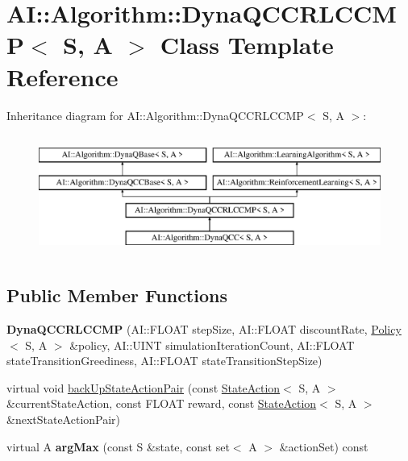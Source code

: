 \hypertarget{classAI_1_1Algorithm_1_1DynaQCCRLCCMP}{\section{A\-I\-:\-:Algorithm\-:\-:Dyna\-Q\-C\-C\-R\-L\-C\-C\-M\-P$<$ S, A $>$ Class Template Reference}
\label{classAI_1_1Algorithm_1_1DynaQCCRLCCMP}
}
Inheritance diagram for A\-I\-:\-:Algorithm\-:\-:Dyna\-Q\-C\-C\-R\-L\-C\-C\-M\-P$<$ S, A $>$\-:\begin{figure}[H]
\begin{center}
\leavevmode
\includegraphics[height=4.000000cm]{classAI_1_1Algorithm_1_1DynaQCCRLCCMP}
\end{center}
\end{figure}
\subsection*{Public Member Functions}
\begin{DoxyCompactItemize}
\item 
\hypertarget{classAI_1_1Algorithm_1_1DynaQCCRLCCMP_a0f499caa1b10a4610e927fa5bbcf1466}{{\bfseries Dyna\-Q\-C\-C\-R\-L\-C\-C\-M\-P} (A\-I\-::\-F\-L\-O\-A\-T step\-Size, A\-I\-::\-F\-L\-O\-A\-T discount\-Rate, \hyperlink{classAI_1_1Algorithm_1_1Policy}{Policy}$<$ S, A $>$ \&policy, A\-I\-::\-U\-I\-N\-T simulation\-Iteration\-Count, A\-I\-::\-F\-L\-O\-A\-T state\-Transition\-Greediness, A\-I\-::\-F\-L\-O\-A\-T state\-Transition\-Step\-Size)}\label{classAI_1_1Algorithm_1_1DynaQCCRLCCMP_a0f499caa1b10a4610e927fa5bbcf1466}

\item 
virtual void \hyperlink{classAI_1_1Algorithm_1_1DynaQCCRLCCMP_aebff9b81db5bd2ae33bd3d6662539bc0}{back\-Up\-State\-Action\-Pair} (const \hyperlink{classAI_1_1StateAction}{State\-Action}$<$ S, A $>$ \&current\-State\-Action, const F\-L\-O\-A\-T reward, const \hyperlink{classAI_1_1StateAction}{State\-Action}$<$ S, A $>$ \&next\-State\-Action\-Pair)
\item 
\hypertarget{classAI_1_1Algorithm_1_1DynaQCCRLCCMP_a145fa4fdba2289842a77c9d483a42ef2}{virtual A {\bfseries arg\-Max} (const S \&state, const set$<$ A $>$ \&action\-Set) const }\label{classAI_1_1Algorithm_1_1DynaQCCRLCCMP_a145fa4fdba2289842a77c9d483a42ef2}

\end{DoxyCompactItemize}
